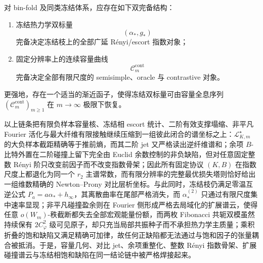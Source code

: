 \begin{conjecture}[冻结双标量与容量全息的双完备原则]\label{conj:conclusion-freezing-capacity-wedderburn-dual-completeness}
对 bin-fold 及同类冻结体系，应存在如下双完备结构：
\begin{enumerate}
  \item 冻结热力学双标量
  \[
  (\alpha_\ast,g_\ast)
  \]
  完备决定冻结枝上的全部广延 Rényi/escort 指数对象；
  \item 固定分辨率上的连续容量曲线
  \[
  \mathcal C_m^{\mathrm{cont}}
  \]
  完备决定全部有限尺度的 semisimple、oracle 与 contrastive 对象。
\end{enumerate}
更强地，存在一个适当的渐近函子，使得冻结双标量可由容量全息序列 \((\mathcal C_m^{\mathrm{cont}})_{m\ge1}\) 在 \(m\to\infty\) 极限下恢复。
\end{conjecture}

\noindent
以上链条把有限负样本容量核、冻结相 escort 统计、二阶有效支撑塌缩、非平凡 Fourier 活化与最大纤维有限接触继续压缩到一组彼此闭合的谱坐标之上：\(\mathcal L_{K,m}^\star\) 的大负样本截距精确等于推前熵，而其二阶 jet 又严格读出逆纤维谱和；余项 \(B\)-比特外置在二阶碰撞上留下完全由 Euclid 余数控制的非负缺陷，但对任意固定整数 Rényi 阶只改变前因子而不改变指数骨架；因此所有固定协议 \((K,B)\) 在指数尺度上都退化为同一个 \(r_2\) 主谱常数，而有限分辨率的完整最优损失塔则恰好给出一组维数精确的 Newton--Prony 对比层析坐标。与此同时，冻结枝仍满足零温互逆公式 \(P_a=a\alpha_\ast+h_\infty\)，其离散曲率在尾部严格消失，而 \(\alpha_\ast^{(2)}\) 只通过有限尺度集中速率显现；非平凡碰撞盈余则在 Fourier 侧形成严格去局域化的扩展谱云，使得任意 \(o(W_m)\)-秩截断都失去全部宏观能量份额，而两枚 Fibonacci 共轭双模虽然持续保有 \(2C_\varphi^2\) 级可见原子，却只充当局部共振种子而不承担热力学主质量；乘积折叠的饱和缺陷又满足精确可加律，故任何正缺陷都无法通过与饱和因子的张量耦合被抵消。于是，容量几何、对比 jet、余项重整化、整数 Rényi 指数骨架、扩展碰撞谱云与冻结相饱和缺陷在同一结论链中被严格焊接起来。

\endinput
